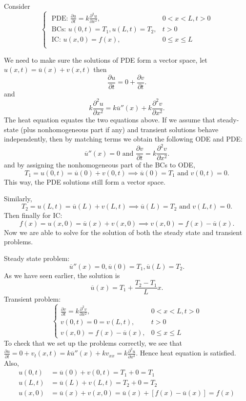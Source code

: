 \documentclass[class=article,crop=false]{standalone}
\begin{document}
\begin{eg}[]
Consider
\begin{equation*}
\begin{cases}
	\text{ PDE: } \frac{\partial u}{\partial t} =k \frac{\partial^2 u}{\partial { x}^2}, & 0<x<L, t>0\\
	\text{ BCs: } u(0,t)=T_1, u(L,t)=T_2, & t>0\\
	\text{ IC: } u(x,0)=f(x), & 0\leq x \leq L\\ 
\end{cases}
\end{equation*}

We need to make sure the solutions of PDE form a vector space, let $ u(x,t)=\overline{u}(x)+v(x,t)$ then
\[
\frac{\partial u}{\partial t} =0+\frac{\partial v}{\partial t} 
.\] 
and
\[
	k \frac{\partial^2 u}{\partial { x}^2} =k \overline{u}''(x)+k \frac{\partial^2 v}{\partial { x}^2} 
.\] 
The heat equation equates the two equations above. If we assume that steady-state (plus nonhomogeneous part if any) and transient solutions behave independently, then by matching terms we obtain the following ODE and PDE:
\[
	\overline{u}''(x)=0 \text{ and } \frac{\partial v}{\partial t} =k \frac{\partial^2 v}{\partial { x}^2}  
.\]
and by assigning the nonhomogeneous part of the BCs to ODE,
\[
	T_1=u(0,t)=\overline{u}(0)+v(0,t) \implies \overline{u}(0)=T_1 \text{ and } v(0,t) =0
.\] 
This way, the PDE solutions still form a vector space.

Similarly, 
\[
	T_2=u(L,t)=\overline{u}(L) + v(L,t) \implies \overline{u}(L)=T_2 \text{ and } v(L,t)=0 
.\] 
Then finally for IC:
\[
	f(x)=u(x,0)=\overline{u}(x)+v(x,0) \implies v(x,0)=f(x)-\overline{u}(x)
.\] 
Now we are able to solve for the solution of both the steady state and transient problems.

Steady state problem:
\[
	\overline{u}''(x)=0, \overline{u}(0)=T_1, \overline{u}(L)=T_2
.\]
As we have seen earlier, the solution is 
\[
	\overline{u}(x)=T_1+ \frac{T_2-T_1}{L}x
.\] 
Transient problem:
\begin{equation*}
\begin{cases}
	\frac{\partial v}{\partial t} = k \frac{\partial^2 v}{\partial { x}^2} ,&0<x<L,t>0\\
	v(0,t)=0=v(L,t), &t>0\\
	v(x,0)=f(x)-\overline{u}(x), &0\leq x\leq L
\end{cases}
\end{equation*}
To check that we set up the problems correctly, we see that $ \frac{\partial u}{\partial t} =0 + v_t(x,t)=k \overline{u}''(x)+kv_{xx} = k \frac{\partial^2 u}{\partial { x}^2} $. Hence heat equation is satisfied.
Also,
\begin{align*}
	u(0,t)&= \overline{u}(0) + v(0,t) = T_1+0=T_1 \\
	u(L,t) &= \overline{u}(L)+v(L,t) = T_2 +0 = T_2 \\
	u(x,0)&=\overline{u}(x) + v(x,0) = \overline{u}(x)+[ f(x) -\overline{u}(x)] = f(x)
\end{align*}



\end{eg}
\end{document}

